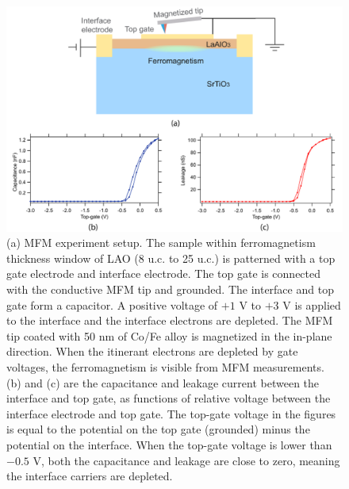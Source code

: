 \documentclass[pdflatex, sectionletters, 12pt]{pittetd}    %
\begin{document}
\begin{figure}[p]
	\centering
	\includegraphics[width=1.0\textwidth]{Drawing/LAOSTOMFM.pdf}
	\caption{(a) MFM experiment setup. The sample within ferromagnetism thickness window of LAO (8 u.c. to 25 u.c.) is patterned with a top gate electrode and interface electrode. The top gate is connected with the conductive MFM tip and grounded. The interface and top gate form a capacitor. A positive voltage of $+1$ V to $+3$ V is applied to the interface and the interface electrons are depleted. The MFM tip coated with 50 nm of Co/Fe alloy is magnetized in the in-plane direction. When the itinerant electrons are depleted by gate voltages, the ferromagnetism is visible from MFM measurements. (b) and (c) are the capacitance and leakage current between the interface and top gate, as functions of relative voltage between the interface electrode and top gate. The top-gate voltage in the figures is equal to the potential on the top gate (grounded) minus the potential on the interface. When the top-gate voltage is lower than $-0.5$ V, both the capacitance and leakage are close to zero, meaning the interface carriers are depleted.}
	\label{FIG:LAOSTOMFM}
\end{figure}
\end{document}
